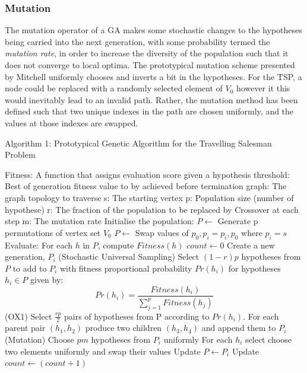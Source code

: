 \documentclass[
	a4paper, %
	10pt, %
	unnumberedsections, %
	twoside, %
]{LTJournalArticle}
\begin{document}
\subsubsection{Mutation} 
The mutation operator of a GA makes some stochastic changes to the hypotheses being carried into the next generation, with some probability termed the \emph{mutation rate}, in order to increase the diversity of the population such that it does not converge to local optima. The prototypical mutation scheme presented by Mitchell uniformly chooses and inverts a bit in the hypotheses. For the TSP, a node could be replaced with a randomly selected element of \(V_{0}\) however it this would inevitably lead to an invalid path. Rather, the mutation method has been defined such that two unique indexes in the path are chosen uniformly, and the values at those indexes are swapped. \\

\begin{algorithm}[H]
	\caption{Algorithm 1: Prototypical Genetic Algorithm for the Travelling Salesman Problem}
	\begin{algorithmic}[1]
			\State Fitness: A function that assigns evaluation score given a hypothesis 
			\State threshold: Best of generation fitness value to by achieved before termination 
			\State graph: The graph topology to traverse
			\State s: The starting vertex 
			\State p: Population size (number of hypothese)
			\State r: The fraction of the population to be replaced by Crossover at each step
			\State m: The mutation rate 
			\State Initialise the population: 
				\State \(P \leftarrow\) Generate p permutations of vertex set \(V_{0}\) 
				\State \(P \leftarrow\) Swap values of \(p_{0}, p_{i} = p_{i}, p_{0}\) where \(p_{i} = s\) 
			\State Evaluate: For each $h$ in $P$, compute $Fitness(h)$
			\State $count \leftarrow 0$ 
				\State Create a new generation, 
				$P_{i}$
				\State (Stochastic Universal Sampling) Select $(1 - r)p$ hypotheses from $P$ to add to $P_{i}$ with fitness proportional probability $Pr(h_{i})$ for hypotheses $h_{i} \in P$ given by: 
					\State \[ Pr(h_{i}) = \frac{Fitness(h_{i})}{\sum_{j=1}^{p} Fitness(h_{j})} \]
				\State (OX1) Select $\frac{rp}{2}$ pairs of hypotheses from P according to $Pr(h_{i})$. 
						\State For each parent pair $(h_{1}, h_{2})$ produce two children $(h_{3}, h_{4})$ and append them to $P_{i}$
					\State (Mutation) Choose $pm$ hypotheses from $P_{i}$ uniformly
						\State For each $h_{i}$ select choose two elements uniformly and swap their values 
					\State Update $P \leftarrow P_{i}$
					\State Update $count \leftarrow (count + 1)$ 
			 \EndWhile  \label{Generation Loop}
		\EndProcedure			
	\end{algorithmic}
	\label{alg:tsp} 
\end{algorithm}
\end{document}
